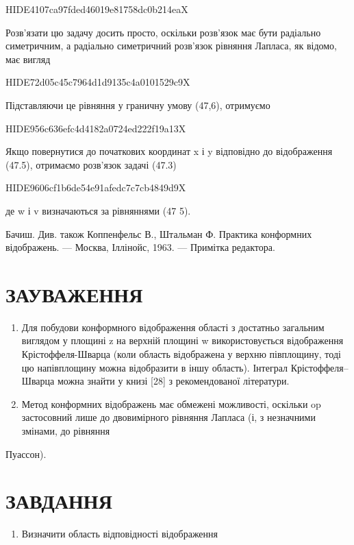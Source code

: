 \documentclass[
  ukrainian,
]{article}
\providecommand{\tightlist}{%
  \setlength{\itemsep}{0pt}\setlength{\parskip}{0pt}}
\begin{document}
HIDE4107ca97fded46019e81758dc0b214eaX

Розв'язати цю задачу досить просто, оскільки розв'язок має бути
радіально симетричним, а радіально симетричний розв'язок рівняння
Лапласа, як відомо, має вигляд

HIDE72d05c45c7964d1d9135c4a0101529c9X

Підставляючи це рівняння у граничну умову (47,6), отримуємо

HIDE956c636efc4d4182a0724ed222f19a13X

Якщо повернутися до початкових координат x і y відповідно до
відображення (47.5), отримаємо розв'язок задачі (47.3)

HIDE9606cf1b6de54e91afedc7c7cb4849d9X

де w і v визначаються за рівняннями (47 5).

Бачиш. Див. також Коппенфельс В., Штальман Ф. Практика конформних
відображень. --- Москва, Іллінойс, 1963. --- Примітка редактора.

\section{ЗАУВАЖЕННЯ}\label{ux437ux430ux443ux432ux430ux436ux435ux43dux43dux44f-12}

\begin{enumerate}
\def\labelenumi{\arabic{enumi}.}
\item
  Для побудови конформного відображення області з достатньо загальним
  виглядом у площині z на верхній площині w використовується
  відображення Крістоффеля-Шварца (коли область відображена у верхню
  півплощину, тоді цю напівплощину можна відобразити в іншу область).
  Інтеграл Крістоффеля--Шварца можна знайти у книзі {[}28{]} з
  рекомендованої літератури.
\item
  Метод конформних відображень має обмежені можливості, оскільки op
  застосовний лише до двовимірного рівняння Лапласа (і, з незначними
  змінами, до рівняння
\end{enumerate}

Пуассон).

\section{ЗАВДАННЯ}\label{ux437ux430ux432ux434ux430ux43dux43dux44f-14}

\begin{enumerate}
\def\labelenumi{\arabic{enumi}.}
\tightlist
\item
  Визначити область відповідності відображення
\end{enumerate}
\end{document}
